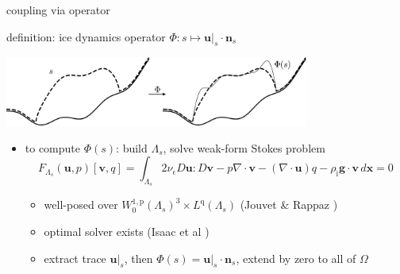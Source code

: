 \documentclass[usepdftitle=false]{beamer}
\newcommand{\eps}{\epsilon}
\newcommand{\Div}{\nabla\cdot}
\newcommand{\bg}{\mathbf{g}}
\newcommand{\bn}{\mathbf{n}}
\newcommand{\bu}{\mathbf{u}}
\newcommand{\bv}{\mathbf{v}}
\newcommand{\bx}{\mathbf{x}}
\newcommand{\rhoi}{\rho_{\text{i}}}
\newcommand{\pp}{{\text{p}}}
\newcommand{\qq}{{\text{q}}}
\newcommand{\bus}{\bu|_s}
\begin{document}
\begin{frame}{coupling via operator}

\begin{block}{definition: ice dynamics operator}
$\Phi : s \mapsto \bus \cdot \bn_s$

\vspace{-3mm}

\hfill \includegraphics[width=0.75\textwidth]{figs/idoaction.png}
\end{block}

\begin{itemize}
\item to compute $\Phi(s)$: build $\Lambda_s$, solve weak-form Stokes problem
    $$F_{\Lambda_s}(\bu,p)[\bv,q] = \int_{\Lambda_s} 2 \nu_\eps D\bu : D\bv - p \Div\bv - (\Div\bu) q - \rhoi \bg \cdot \bv\,d\bx = 0$$

    \begin{itemize}
    \item well-posed over $W_0^{1,\pp}(\Lambda_s)^3 \times L^\qq(\Lambda_s)$ (Jouvet \& Rappaz \cite{JouvetRappaz2011})
    \item optimal solver exists (Isaac et al \cite{IsaacStadlerGhattas2015})
    \item extract trace $\bus$, then $\Phi(s) = \bus \cdot \bn_s$, extend by zero to all of $\Omega$
    \end{itemize}
\end{itemize}

\end{frame}
\end{document}
